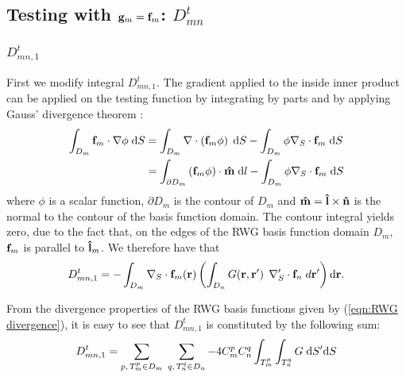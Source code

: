 \subsection{Testing with $\mathbf{g}_m = \mathbf{f}_m$: $D_{mn}^t$}
\subsubsection{$D_{mn,1}^t$}
%
\par
First we modify integral $D_{mn,1}^t$. The gradient applied to the inside inner product can be applied on the testing function by integrating by parts and by applying Gauss' divergence theorem \cite{Rao_82, Taskinen_03}:
\begin{equation} \label{eqn:Gauss' divergence theorem}
\begin{split}
\int_{D_m} \mathbf{f}_m \cdot \nabla \phi \; \text{d} S &= \int_{D_m} \nabla \cdot \left( \mathbf{f}_m \phi \right) \; \text{d} S - \int_{D_m} \phi \nabla_S \cdot \mathbf{f}_m \; \text{d} S \\
&= \int_{\partial D_m} \left(\mathbf{f}_m \phi \right) \cdot \mathbf{\Hat{m}} \; \text{d} l - \int_{D_m} \phi \nabla_S \cdot \mathbf{f}_m \; \text{d} S
\end{split}
\end{equation}
where $\phi$ is a scalar function, $\partial D_m$ is the contour of $D_m$ and $\mathbf{\Hat{m}} = \mathbf{\Hat{l}} \times \mathbf{\Hat{n}}$ is the normal to the contour of the basis function domain. The contour integral yields zero, due to the fact that, on the edges of the RWG basis function domain $D_m$, $\mathbf{f}_m$ is parallel to $\mathbf{\Hat{l}}_m$. We therefore have that
\begin{equation}
D_{mn,1}^t = -\int_{D_m}  \nabla_S \cdot \mathbf{f}_m\!\left(\mathbf{r}\right)  \left( \int_{D_n} G\!\left(\mathbf{r},\mathbf{r}'\right) \; \nabla_S^\prime \cdot \mathbf{f}_n  \; d \mathbf{r}'\right) \text{d} \mathbf{r}.
\end{equation}
%
\par
From the divergence properties of the RWG basis functions given by (\ref{eqn:RWG divergence}), it is easy to see that $D_{mn,1}^t$ is constituted by the following sum:
\begin{equation} \label{eqn:MoM scalar potential term}
D_{mn,1}^t = \sum_{p, \, T_m^p \in D_m} \; \sum_{q, \, T_n^q \in D_n} -4 C_m^p C_n^q \int_{T_m^p} \int_{T_n^q} G \; \text{d} S' \text{d} S
\end{equation}
